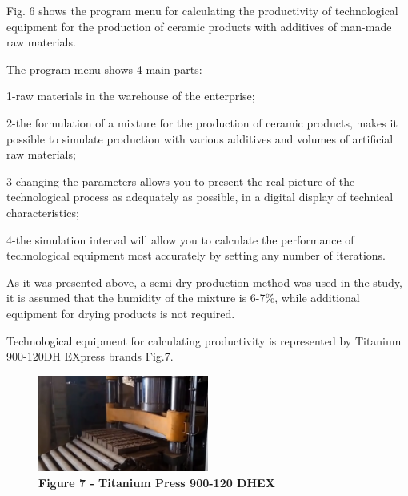 \begin{multicols}{2}
Fig. 6 shows the program menu for calculating the productivity of
technological equipment for the production of ceramic products with
additives of man-made raw materials.

The program menu shows 4 main parts:

1-raw materials in the warehouse of the enterprise;

2-the formulation of a mixture for the production of ceramic products,
makes it possible to simulate production with various additives and
volumes of artificial raw materials;

3-changing the parameters allows you to present the real picture of the
technological process as adequately as possible, in a digital display of
technical characteristics;

4-the simulation interval will allow you to calculate the performance of
technological equipment most accurately by setting any number of
iterations.

As it was presented above, a semi-dry production method was used in the
study, it is assumed that the humidity of the mixture is 6-7\%, while
additional equipment for drying products is not required.

Technological equipment for calculating productivity is represented by
Titanium 900-120DH EXpress brands Fig.7.
\end{multicols}

\begin{figure}[H]
	\centering
	\includegraphics[width=0.5\textwidth]{assets/273}
	\caption*{\bfseries Figure 7 - Titanium Press 900-120 DHEX}
\end{figure}



